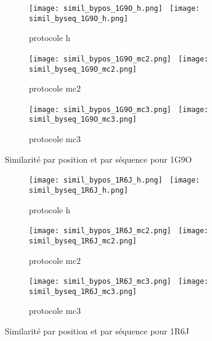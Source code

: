    \begin{figure}
   \begin{subfigure}[b]{\linewidth}
     \centering
          \texttt{[image: simil\_bypos\_1G9O\_h.png]}~
          \texttt{[image: simil\_byseq\_1G9O\_h.png]} 
     \caption{protocole h}
   \end{subfigure}

   \begin{subfigure}[b]{\linewidth}
     \centering
          \texttt{[image: simil\_bypos\_1G9O\_mc2.png]}~ 
          \texttt{[image: simil\_byseq\_1G9O\_mc2.png]} 
     \caption{protocole mc2}
   \end{subfigure}

   \begin{subfigure}[b]{\linewidth}
     \centering
          \texttt{[image: simil\_bypos\_1G9O\_mc3.png]}~  
          \texttt{[image: simil\_byseq\_1G9O\_mc3.png]} 
     \caption{protocole mc3}
   \end{subfigure}

     \caption{Similarité par position et par séquence pour 1G9O}
\label{grah:simil_1G9O}
   \end{figure}

   \begin{figure}
   \begin{subfigure}[b]{\linewidth}
     \centering
          \texttt{[image: simil\_bypos\_1R6J\_h.png]}~
          \texttt{[image: simil\_byseq\_1R6J\_h.png]} 
     \caption{protocole h}
   \end{subfigure}

   \begin{subfigure}[b]{\linewidth}
     \centering
          \texttt{[image: simil\_bypos\_1R6J\_mc2.png]}~ 
          \texttt{[image: simil\_byseq\_1R6J\_mc2.png]} 
     \caption{protocole mc2}
   \end{subfigure}

   \begin{subfigure}[b]{\linewidth}
     \centering
          \texttt{[image: simil\_bypos\_1R6J\_mc3.png]}~  
          \texttt{[image: simil\_byseq\_1R6J\_mc3.png]} 
     \caption{protocole mc3}
   \end{subfigure}

     \caption{Similarité par position et par séquence pour 1R6J}
\label{grah:simil_1R6J}
   \end{figure}


